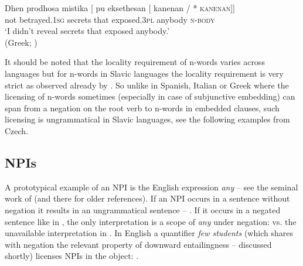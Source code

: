 \documentclass[output=paper,
]{langscibook}
\begin{document}
\ea \gll Dhen prodhosa mistika [\hspace{-2pt} pu eksethesan [\hspace{-2pt}  kanenan /\hspace{-2pt} *\hspace{-2pt} \textsc{kanenan}]]\\
not betrayed.\textsc{1sg} secrets {} that exposed.\textsc{3pl} {} anybody {} {} \textsc{n-body} {}\\
\glt `I didn't reveal secrets that exposed anybody.'\\\xspace\hfill (Greek; \citealt[18]{giannakidou2017landscape})
\z

\noindent It should be noted that the locality requirement of n-words varies across languages but for n-words in Slavic languages the  locality requirement is very strict  as observed already by \cite{progovac1993negative}. So unlike in Spanish, Italian or Greek where the licensing of n-words sometimes (especially in case of subjunctive embedding) can span from a negation on the root verb to n-words in embedded clauses, such licensing is ungrammatical in Slavic languages, see the following examples from Czech.

\ea {}
\z
\z

\subsection{NPIs}\label{npis}

A prototypical example of an NPI is the English expression \textit{any} -- see the seminal work of \cite{kadmon1993any} (and there for older references). If an NPI occurs in a sentence without negation it results in an ungrammatical sentence -- . If it occurs in a negated sentence like in , the only interpretation is a scope of \textit{any} under negation:  vs. the unavailable interpretation in . In English a quantifier \textit{few students} (which shares with negation the relevant property of downward entailingness -- discussed shortly) licenses NPIs in the object: .
\end{document}
